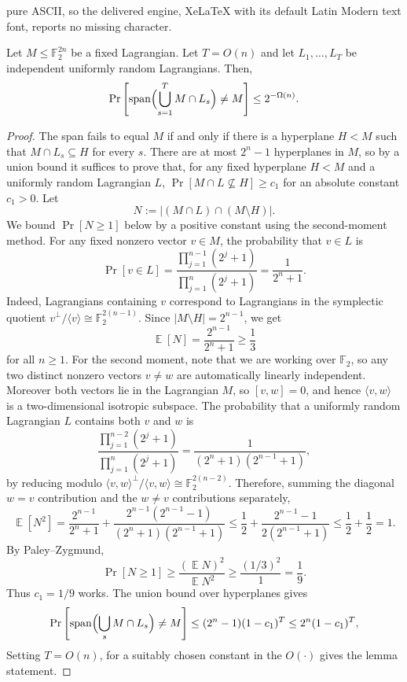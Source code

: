 \documentclass[10pt,a4paper]{amsart}
\newcommand{\E}{\mathop{\mathbb{E}}}
\newcommand{\F}{\mathbb{F}}
\begin{document}
pure ASCII, so the delivered engine, XeLaTeX with its default Latin Modern text font, reports no missing character.
\begin{lemma}
\label{lem:random-basis-spans-signs}
Let $M\le\F_2^{2n}$ be a fixed Lagrangian. Let $T=O(n)$ and let
$L_1,\ldots,L_T$ be independent uniformly random Lagrangians.  Then,
$$
    \Pr\left[
        \operatorname{span}\Bigl(\bigcup_{s=1}^T M\cap L_s\Bigr)\ne M
    \right]
    \le
2^{-\Omega(n)}.
$$
\end{lemma}

\begin{proof}
The span fails to equal $M$ if and only if there is a hyperplane
$H<M$ such that
$  M\cap L_s\subseteq H$ 
for every $s$.  There are at most $2^n-1$ hyperplanes in $M$, so by a
union bound it suffices to prove that, for any fixed hyperplane $H<M$ and a
uniformly random Lagrangian $L$,
$   \Pr[M\cap L\not\subseteq H]\ge c_1$  
for an absolute constant $c_1>0$. 
Let
$$
    N:=\left|(M\cap L)\cap(M\setminus H)\right|.
$$
We bound $\Pr[N\ge1]$ below by a positive constant using the second-moment
method. 
For any fixed nonzero vector $v\in M$, the probability that $v\in L$ is
$$
    \Pr[v\in L]
    =
    \frac{\prod_{j=1}^{n-1}(2^j+1)}
         {\prod_{j=1}^{n}(2^j+1)}
    =
    \frac{1}{2^n+1}.
$$
Indeed, Lagrangians containing $v$ correspond to Lagrangians in the symplectic
quotient $v^\perp/\langle v\rangle\cong\F_2^{2(n-1)}$.  Since
$|M\setminus H|=2^{n-1}$, we get
$$
    \E[ N]
    =
    \frac{2^{n-1}}{2^n+1}
    \ge \frac13
$$
for all $n\ge1$. 
For the second moment, note that we are working over $\F_2$, so any two
distinct nonzero vectors $v\ne w$ are automatically linearly independent.
Moreover both vectors lie in the Lagrangian $M$, so $[v,w]=0$, and hence
$\langle v,w\rangle$ is a two-dimensional isotropic subspace.  The
probability that a uniformly random Lagrangian $L$ contains both $v$ and
$w$ is
$$
    \frac{\prod_{j=1}^{n-2}(2^j+1)}
         {\prod_{j=1}^{n}(2^j+1)}
    =
    \frac{1}{(2^n+1)(2^{n-1}+1)},
$$
by reducing modulo $\langle v,w\rangle^\perp/\langle v,w\rangle\cong
\F_2^{2(n-2)}$.  Therefore, summing the diagonal $w=v$ contribution and the
$w\ne v$ contributions separately,
$$
    \E [N^2]
    =
    \frac{2^{n-1}}{2^n+1}
    +
    \frac{2^{n-1}(2^{n-1}-1)}
         {(2^n+1)(2^{n-1}+1)}
    \le
    \frac12+\frac{2^{n-1}-1}{2(2^{n-1}+1)}
    \le
    \frac12+\frac12=1.
$$
By Paley--Zygmund,
$$
    \Pr[N\ge1]\ge \frac{(\E N)^2}{\E N^2}\ge \frac{(1/3)^2}{1}=\frac19.
$$
Thus $c_1=1/9$ works.  The union bound over hyperplanes gives
$$
    \Pr\left[
        \operatorname{span}\Bigl(\bigcup_s M\cap L_s\Bigr)\ne M
    \right]
    \le
    (2^n-1)(1-c_1)^T
    \le
    2^n(1-c_1)^T,
$$
Setting $T=O(n)$, for a suitably chosen constant in the $O(\cdot)$ gives the lemma statement.
\end{proof}
\end{document}

